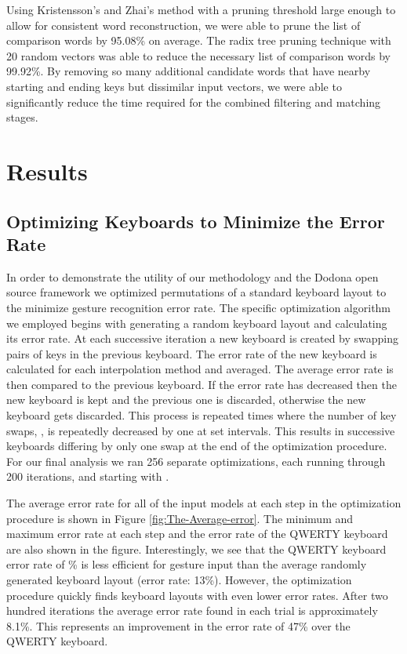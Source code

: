 \documentclass[final,1p,times,authoryear]{elsarticle}
\begin{document}
Using Kristensson's and Zhai's method with a pruning threshold large enough to allow for consistent word reconstruction, we were able to prune the list of comparison words by 95.08\% on average.
The radix tree pruning technique with 20 random vectors was able to reduce the necessary list of comparison words by 99.92\%.
By removing so many additional candidate words that have nearby starting and ending keys but dissimilar input vectors, we were able to significantly reduce the time required for the combined filtering and matching stages.


\section{\textbf{Results}}\label{sec:Results}


\subsection{Optimizing Keyboards to Minimize the Error Rate \label{sub:Keyboard-Optimization}}
In order to demonstrate the utility of our methodology and the Dodona open source framework we optimized permutations of a standard keyboard layout to the minimize gesture recognition error rate.
The specific optimization algorithm we employed begins with generating
a random keyboard layout and calculating its error rate. At each
successive iteration a new keyboard is created by swapping  pairs
of keys in the previous keyboard. The error rate of the new keyboard
is calculated for each interpolation method and averaged. The average
error rate is then compared to the previous keyboard. If the error
rate has decreased then the new keyboard is kept and the previous
one is discarded, otherwise the new keyboard gets discarded. This
process is repeated  times where the number of key swaps, ,
is repeatedly decreased by one at set intervals. This results in successive
keyboards differing by only one swap at the end of the optimization
procedure. For our final analysis we ran 256 separate optimizations,
each running through 200 iterations, and starting with . 

The average error rate for all of the input models at each step in the optimization
procedure is shown in Figure \ref{fig:The-Average-error}. The minimum
and maximum error rate at each step and the error rate of the QWERTY
keyboard are also shown in the figure. Interestingly, we see that
the QWERTY keyboard error rate of \% is less efficient for gesture
input than the average randomly generated keyboard layout (error rate:
13\%). However, the optimization procedure quickly finds keyboard 
layouts with even lower error rates. After two hundred iterations the average error 
rate found in each trial is approximately 8.1\%. This represents an improvement in the
error rate of 47\% over the QWERTY keyboard. 
\end{document}
